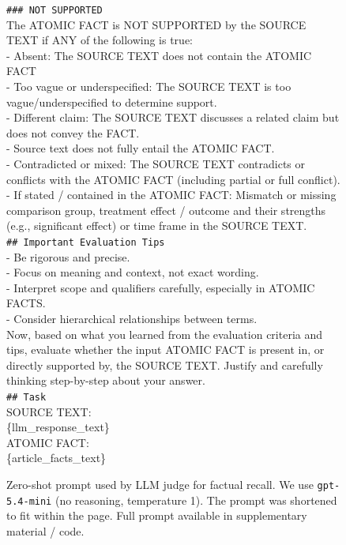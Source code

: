 \documentclass{article}
\begin{document}
\begin{figure}[t]
\begin{small}
\begin{tcolorbox}[
    colback=gray!5,
    colframe=black,
    width=\linewidth,
    arc=2mm,
    boxrule=0.5pt,
    title=\textbf{LLM Judge Prompt for Factual Recall Evaluation}
]
\texttt{\#\#\# NOT SUPPORTED} \\
The ATOMIC FACT is NOT SUPPORTED by the SOURCE TEXT if ANY of the following is true:\\
- Absent: The SOURCE TEXT does not contain the ATOMIC FACT\\
- Too vague or underspecified: The SOURCE TEXT is too vague/underspecified to determine support.\\
- Different claim: The SOURCE TEXT discusses a related claim but does not convey the FACT.\\
- Source text does not fully entail the ATOMIC FACT.\\
- Contradicted or mixed: The SOURCE TEXT contradicts or conflicts with the ATOMIC FACT (including partial or full conflict).\\ 
- If stated / contained in the ATOMIC FACT: Mismatch or missing comparison group, treatment effect / outcome and their strengths (e.g., significant effect) or time frame in the SOURCE TEXT.\\

\texttt{\#\# Important Evaluation Tips}\\
- Be rigorous and precise. \\
- Focus on meaning and context, not exact wording. \\
- Interpret scope and qualifiers carefully, especially in ATOMIC FACTS.\\
- Consider hierarchical relationships between terms. \\

Now, based on what you learned from the evaluation criteria and tips, evaluate whether the input ATOMIC FACT is present in, or directly supported by, the SOURCE TEXT. Justify and carefully thinking step-by-step about your answer.\\

\texttt{\#\# Task}\\
SOURCE TEXT: \\
\{llm\_response\_text\}\\

ATOMIC FACT: \\
\{article\_facts\_text\}
\end{tcolorbox}

\caption{Zero-shot prompt used by LLM judge for factual recall. We use \texttt{gpt-5.4-mini} (no reasoning, temperature 1). The prompt was shortened to fit within the page. Full prompt available in supplementary material / code.}
\label{fig:fact-recall-prompt}
\end{small}
\end{figure}
\end{document}
